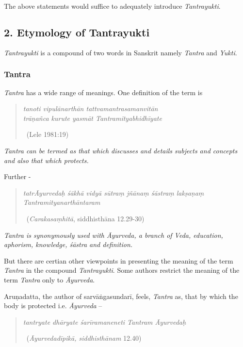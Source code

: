 The above statements would suffice to adequately introduce \textit{Tantrayukti}.


\subsection*{2. Etymology of Tantrayukti}

\textit{Tantrayukti} is a compound of two words in Sanskrit namely \textit{Tantra} and \textit{Yukti}.

\subsubsection*{Tantra}

\textit{Tantra} has a wide range of meanings. One definition of the term is

\begin{verse}
\textit{tanoti vipulānarthān tattvamantrasamanvitān }\\\textit{ trāṇañca kurute yasmāt Tantramityabhidhīyate }

~\hfill (Lele 1981:19)
\end{verse}

\textit{Tantra can be termed as that which discusses and details subjects and concepts and also that which protects.}

Further -

\begin{verse}
\textit{tatrĀyurvedaḥ śākhā vidyā sūtraṃ jñānaṃ śāstraṃ lakṣaṇaṃ Tantramityanarthāntaram}

~\hfill (\textit{Carakasaṃhitā}, siddhisthāna 12.29-30)
\end{verse}

\textit{Tantra is synonymously used with Āyurveda, a branch of Veda, education, aphorism, knowledge, śāstra and definition.}

But there are certian other viewpoints in presenting the meaning of the term \textit{Tantra} in the compound \textit{Tantrayukti}. Some authors restrict the meaning of the term \textit{Tantra} only to \textit{Āyurveda}.

Aruṇadatta, the author of sarvāṅgasundarī, feels, \textit{Tantra} as, that by which the body is protected i.e. \textit{Āyurveda} –

\begin{verse}
\textit{tantryate dhāryate śarīramaneneti Tantram Āyurvedaḥ}

~\hfill (\textit{Āyurvedadīpikā, siddhisthānam} 12.40)
\end{verse}

